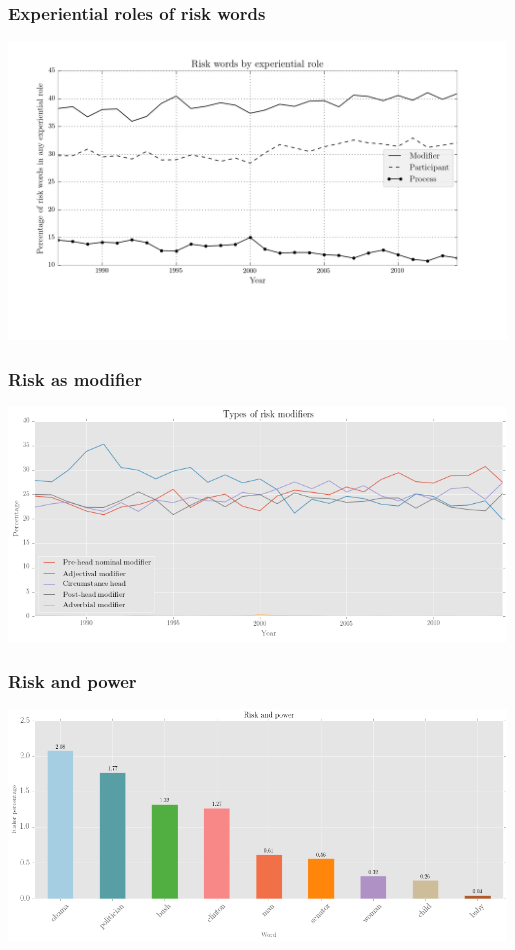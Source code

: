 \documentclass{beamer}       %
\begin{document}
\begin{frame}
    \frametitle{Experiential roles of risk words}
    \centering
    \includegraphics[width=0.99\textwidth]{../images/ppmfinal}
\end{frame}

\begin{frame}
    \frametitle{Risk as modifier}
    \centering
    \includegraphics[width=0.99\textwidth]{../images/types-of-risk-modifiers}
\end{frame}

\begin{frame}
    \frametitle{Risk and power}
    \centering
    \includegraphics[width=0.99\textwidth]{../images/risk-and-power-2}
\end{frame}
\end{document}
